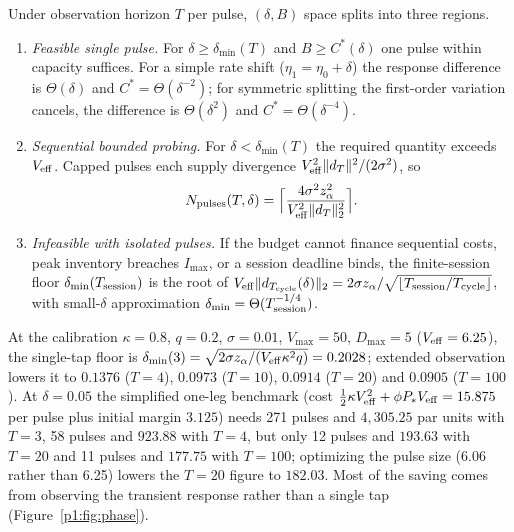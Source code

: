 \begin{proposition}\label{p1:prop:tri}
Under observation horizon $T$ per pulse, $(\delta,B)$ space splits into three regions.
\begin{enumerate}[label=(\roman*)]
\item \emph{Feasible single pulse.} For $\delta\ge\delta_{\min}(T)$ and $B\ge C^*(\delta)$ one pulse within capacity suffices. For a simple rate shift ($\eta_1=\eta_0+\delta$) the response difference is $\Theta(\delta)$ and $C^*=\Theta(\delta^{-2})$; for symmetric splitting the first-order variation cancels, the difference is $\Theta(\delta^2)$ and $C^*=\Theta(\delta^{-4})$.
\item \emph{Sequential bounded probing.} For $\delta<\delta_{\min}(T)$ the required quantity exceeds $V_{\rm eff}$. Capped pulses each supply divergence $V_{\rm eff}^2\|d_T\|^2/(2\sigma^2)$, so
\begin{equation}\label{p1:eq:npulses}
N_{\rm pulses}(T,\delta)=\Bigl\lceil\frac{4\sigma^2z_\alpha^2}{V_{\rm eff}^2\|d_T\|_2^2}\Bigr\rceil .
\end{equation}
\item \emph{Infeasible with isolated pulses.} If the budget cannot finance sequential costs, peak inventory breaches $I_{\max}$, or a session deadline binds, the finite-session floor $\delta_{\min}(T_{\rm session})$ is the root of $V_{\rm eff}\|d_{T_{\rm cycle}}(\delta)\|_2=2\sigma z_\alpha/\sqrt{\lfloor T_{\rm session}/T_{\rm cycle}\rfloor}$, with small-$\delta$ approximation $\delta_{\min}=\Theta(T_{\rm session}^{-1/4})$.
\end{enumerate}
\end{proposition}

At the calibration $\kappa=0.8$, $q=0.2$, $\sigma=0.01$, $V_{\max}=50$, $D_{\max}=5$ ($V_{\rm eff}=6.25$), the single-tap floor is $\delta_{\min}(3)=\sqrt{2\sigma z_\alpha/(V_{\rm eff}\kappa^2q)}=0.2028$; extended observation lowers it to $0.1376$ ($T=4$), $0.0973$ ($T=10$), $0.0914$ ($T=20$) and $0.0905$ ($T=100$). At $\delta=0.05$ the simplified one-leg benchmark (cost $\tfrac12\kappa V_{\rm eff}^2+\phi P_*V_{\rm eff}=15.875$ per pulse plus initial margin $3.125$) needs 271 pulses and $4{,}305.25$ par units with $T=3$, 58 pulses and $923.88$ with $T=4$, but only 12 pulses and $193.63$ with $T=20$ and 11 pulses and $177.75$ with $T=100$; optimizing the pulse size (6.06 rather than 6.25) lowers the $T=20$ figure to $182.03$. Most of the saving comes from observing the transient response rather than a single tap (Figure~\ref{p1:fig:phase}).

